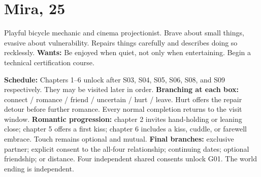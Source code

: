\documentclass[11pt]{article}
\begin{document}
\section*{Mira, 25}
Playful bicycle mechanic and cinema projectionist. Brave about small things, evasive about vulnerability. Repairs things carefully and describes doing so recklessly.
\medskip
\textbf{Wants:} Be enjoyed when quiet, not only when entertaining. Begin a technical certification course.
\medskip
\begin{center}\end{center}
\textbf{Schedule:} Chapters 1--6 unlock after S03, S04, S05, S06, S08, and S09 respectively. They may be visited later in order.
\medskip
\textbf{Branching at each box:} connect / romance / friend / uncertain / hurt / leave. Hurt offers the repair detour before further romance. Every normal completion returns to the visit window.
\medskip
\textbf{Romantic progression:} chapter 2 invites hand-holding or leaning close; chapter 5 offers a first kiss; chapter 6 includes a kiss, cuddle, or farewell embrace. Touch remains optional and mutual.
\medskip
\textbf{Final branches:} exclusive partner; explicit consent to the all-four relationship; continuing dates; optional friendship; or distance. Four independent shared consents unlock G01. The world ending is independent.
\newpage
\end{document}
